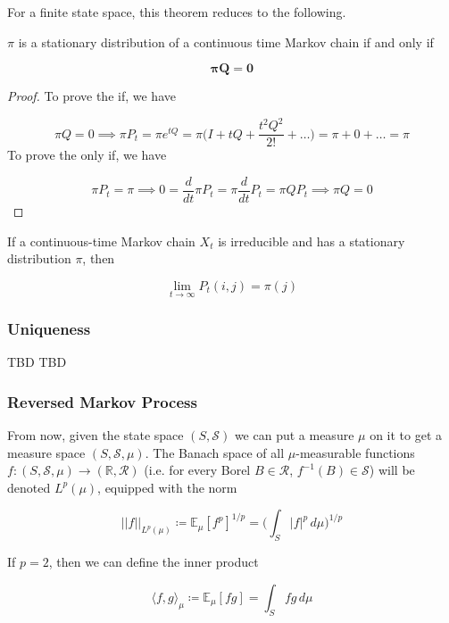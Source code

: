 \documentclass{article}
\begin{document}
    For a finite state space, this theorem reduces to the following. 

    \begin{corollary}
      $\pi$ is a stationary distribution of a continuous time Markov chain if and only if 

        \[\boldsymbol{\pi} \mathbf{Q} = \mathbf{0}\]
    \end{corollary}
    \begin{proof}
      To prove the if, we have 

        \[\pi Q = 0 \implies \pi P_t= \pi e^{t Q} = \pi \bigg(I + t Q + \frac{t^2 Q^2}{2!} + \ldots \bigg) = \pi + 0 + \ldots = \pi\]
      To prove the only if, we have 

        \[\pi P_t = \pi \implies 0 = \frac{d}{dt} \pi P_t = \pi \frac{d}{dt} P_t = \pi Q P_t \implies \pi Q = 0\]
    \end{proof}

    \begin{theorem}
      If a continuous-time Markov chain $X_t$ is irreducible and has a stationary distribution $\pi$, then 

        \[\lim_{t \rightarrow \infty} P_t (i, j) = \pi(j)\]
    \end{theorem}

    \subsubsection{Uniqueness} 

      TBD
      TBD

    \subsubsection{Reversed Markov Process}

      From now, given the state space $(S, \mathcal{S})$ we can put a measure $\mu$ on it to get a measure space $(S, \mathcal{S}, \mu)$. The Banach space of all $\mu$-measurable functions $f: (S, \mathcal{S}, \mu) \rightarrow (\mathbb{R}, \mathcal{R})$ (i.e. for every Borel $B \in \mathcal{R}$, $f^{-1}(B) \in \mathcal{S}$) will be denoted $L^p (\mu)$, equipped with the norm 

        \[||f||_{L^p(\mu)} \coloneqq \mathbb{E}_\mu [f^p]^{1/p} = \bigg( \int_S |f|^p \,d\mu \bigg)^{1/p}\]

      If $p = 2$, then we can define the inner product 

        \[\langle f, g \rangle_\mu \coloneqq \mathbb{E}_\mu [f g] = \int_S f g \, d\mu\]
\end{document}

